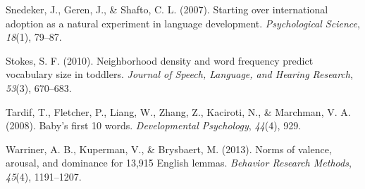 \documentclass[10pt, letterpaper]{article}
\begin{document}
Snedeker, J., Geren, J., \& Shafto, C. L. (2007). Starting over
international adoption as a natural experiment in language development.
\emph{Psychological Science}, \emph{18}(1), 79--87.

Stokes, S. F. (2010). Neighborhood density and word frequency predict
vocabulary size in toddlers. \emph{Journal of Speech, Language, and
Hearing Research}, \emph{53}(3), 670--683.

Tardif, T., Fletcher, P., Liang, W., Zhang, Z., Kaciroti, N., \&
Marchman, V. A. (2008). Baby's first 10 words. \emph{Developmental
Psychology}, \emph{44}(4), 929.

Warriner, A. B., Kuperman, V., \& Brysbaert, M. (2013). Norms of
valence, arousal, and dominance for 13,915 English lemmas.
\emph{Behavior Research Methods}, \emph{45}(4), 1191--1207.
\end{document}
